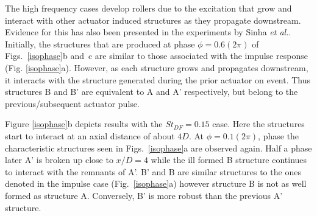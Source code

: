 \documentclass[english]{aiaa-tc}
\begin{document}
The high frequency cases develop rollers due to the excitation that
grow and interact with other actuator induced structures as they
propagate downstream. Evidence for this has also been presented in the
experiments by Sinha {\em et al.}\cite{sinha2013}. Initially, the structures that
are produced at phase $\phi=0.6(2\pi)$ of Figs.~\ref{isophase}b and~c
are similar to those associated with the impulse response (Fig.
\ref{isophase}a).  However, as each structure grows and propagates downstream,
it interacts with the structure generated during the prior actuator on event.
Thus structures B and B' are equivalent to A and A' respectively, but belong
to the previous/subsequent actuator pulse.

Figure \ref{isophase}b depicts results with the $St_{DF}=0.15$ case.
Here the structures start to interact at an axial distance of about
$4D$. At $\phi=0.1(2\pi)$, phase the characteristic structures seen in
Figs.~\ref{isophase}a are observed again. Half a phase later A' is
broken up close to $x/D=4$ while the ill formed B structure continues
to interact with the remnants of A'. B' and B are similar structures
to the ones denoted in the impulse case (Fig.~\ref{isophase}a) however
structure B is not as well formed as structure A. 
Conversely, B' is more robust than the previous A' structure. 
\end{document}
